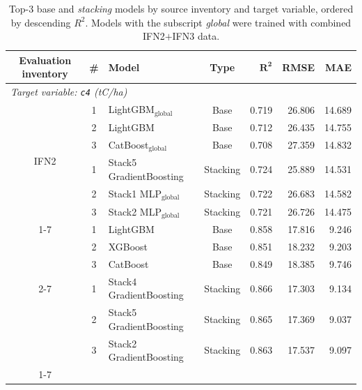 \begin{table}[htbp]
    \centering
    \caption{Top-3 base and \textit{stacking} models by source inventory and target variable, ordered by descending $R^2$. Models with the subscript \textit{global} were trained with combined IFN2$+$IFN3 data.}
    \label{tab:top3_modelos}
    \small
    \renewcommand{\arraystretch}{1.1}
    \begin{tabular}{cclcrrr}
        \toprule
        \textbf{Evaluation inventory} & \textbf{\#} & \textbf{Model} & \textbf{Type} & $\boldsymbol{R^2}$ & \textbf{RMSE} & \textbf{MAE} \\
        \midrule
        \multicolumn{7}{l}{\textit{Target variable: \texttt{c4} (tC/ha)}} \\
        \midrule
        \multirow{6}{*}{IFN2}
            & 1 & LightGBM$_{\text{global}}$             & Base     & 0.719 & 26.806 & 14.689 \\
            & 2 & LightGBM                               & Base     & 0.712 & 26.435 & 14.755 \\
            & 3 & CatBoost$_{\text{global}}$             & Base     & 0.708 & 27.359 & 14.832 \\
        \cmidrule{2-7}
            & 1 & Stack5 GradientBoosting                & Stacking & 0.724 & 25.889 & 14.531 \\
            & 2 & Stack1 MLP$_{\text{global}}$           & Stacking & 0.722 & 26.683 & 14.582 \\
            & 3 & Stack2 MLP$_{\text{global}}$           & Stacking & 0.721 & 26.726 & 14.475 \\
        \cmidrule{1-7}
        \multirow{6}{*}{IFN3}
            & 1 & LightGBM                               & Base     & 0.858 & 17.816 &  9.246 \\
            & 2 & XGBoost                                & Base     & 0.851 & 18.232 &  9.203 \\
            & 3 & CatBoost                               & Base     & 0.849 & 18.385 &  9.746 \\
        \cmidrule{2-7}
            & 1 & Stack4 GradientBoosting                & Stacking & 0.866 & 17.303 &  9.134 \\
            & 2 & Stack5 GradientBoosting                & Stacking & 0.865 & 17.369 &  9.037 \\
            & 3 & Stack2 GradientBoosting                & Stacking & 0.863 & 17.537 &  9.097 \\
        \cmidrule{1-7}
        \multirow{6}{*}{IFN2$+$IFN3}

\end{tabular}
\end{table}
